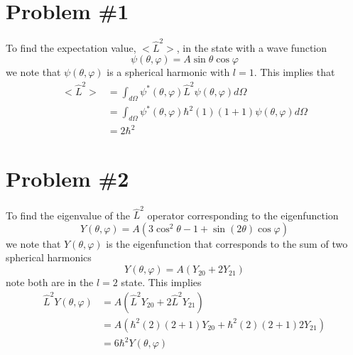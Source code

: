 \documentclass[11pt]{article}
\numberwithin{equation}{section}
\begin{document}


\section{Problem \#1}
To find the expectation value, $<\hat{L}^2>$, in the state with a wave function
$$\psi(\theta,\varphi) = A\sin\theta\cos\varphi$$
we note that $\psi(\theta,\varphi)$ is a spherical harmonic with $l=1$. This implies that
\begin{align*}  
<\hat{L}^2> &= \int_{d\Omega}\psi^*(\theta,\varphi)\hat{L}^2\psi(\theta,\varphi)d\Omega\\
&= \int_{d\Omega}\psi^*(\theta,\varphi)\hbar^2(1)(1+1)\psi(\theta,\varphi)d\Omega\\
&= 2\hbar^2
\end{align*}  

\section{Problem \#2}
To find the eigenvalue of the $\hat{L}^2$ operator corresponding to the eigenfunction
$$Y(\theta,\varphi) = A(3\cos^2\theta-1+\sin(2\theta)\cos\varphi)$$
we note that $Y(\theta,\varphi)$ is the eigenfunction that corresponds to the sum of two 
spherical harmonics 
$$Y(\theta,\varphi) = A(Y_{20} + 2Y_{21})$$
note both are in the $l=2$ state. This implies
\begin{align*}
\hat{L}^2Y(\theta,\varphi) &= A(\hat{L}^2Y_{20} + 2\hat{L}^2Y_{21})\\
&= A(\hbar^2(2)(2+1)Y_{20} + \hbar^2(2)(2+1)2Y_{21})\\
&= 6\hbar^2Y(\theta,\varphi)
\end{align*}

\pagebreak
\end{document}
